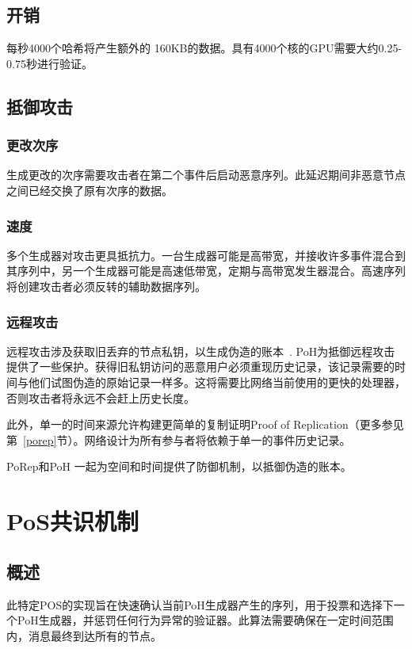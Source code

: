 \documentclass[12pt, uft8]{ctexart}
\begin{document}
\subsection{开销}
每秒4000个哈希将产生额外的 160KB的数据。具有4000个核的GPU需要大约0.25-0.75秒进行验证。

\subsection{抵御攻击}
\subsubsection{更改次序}
生成更改的次序需要攻击者在第二个事件后启动恶意序列。此延迟期间非恶意节点之间已经交换了原有次序的数据。

\subsubsection{速度}
多个生成器对攻击更具抵抗力。一台生成器可能是高带宽，并接收许多事件混合到其序列中，另一个生成器可能是高速低带宽，定期与高带宽发生器混合。高速序列将创建攻击者必须反转的辅助数据序列。

\subsubsection{远程攻击}

远程攻击涉及获取旧丢弃的节点私钥，以生成伪造的账本~\cite{casper}. PoH为抵御远程攻击提供了一些保护。获得旧私钥访问的恶意用户必须重现历史记录，该记录需要的时间与他们试图伪造的原始记录一样多。这将需要比网络当前使用的更快的处理器，否则攻击者将永远不会赶上历史长度。  

此外，单一的时间来源允许构建更简单的复制证明Proof of Replication（更多参见第~\ref{porep}节）。网络设计为所有参与者将依赖于单一的事件历史记录。

PoRep和PoH 一起为空间和时间提供了防御机制，以抵御伪造的账本。


\section{PoS共识机制}\label{proof_of_stake}
\subsection{概述}
此特定POS的实现旨在快速确认当前PoH生成器产生的序列，用于投票和选择下一个PoH生成器，并惩罚任何行为异常的验证器。此算法需要确保在一定时间范围内，消息最终到达所有的节点。
\end{document}
